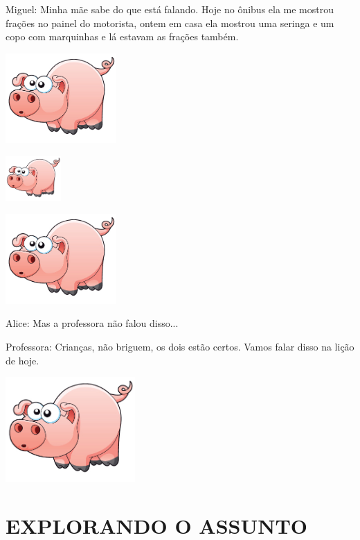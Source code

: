 \documentclass[a4,12pt]{book}
\begin{document}
\begin{imagem*}[breakable]{}{}
  Miguel: Minha mãe sabe do que está falando. Hoje no ônibus ela me mostrou frações no painel do motorista, ontem em casa ela mostrou uma seringa e um copo com marquinhas e lá estavam as frações também.

    \includegraphics[width=120pt, keepaspectratio]{pig}

    \includegraphics[width=60pt, keepaspectratio]{pig}

    \includegraphics[width=120pt, keepaspectratio]{pig}


  Alice: Mas a professora não falou disso...

  Professora: Crianças, não briguem, os dois estão certos. Vamos falar disso na lição de hoje.

\end{imagem*}




\includegraphics[width=\textwidth,height=4cm, keepaspectratio]{pig}


\section*{ EXPLORANDO O ASSUNTO }
\end{document}
